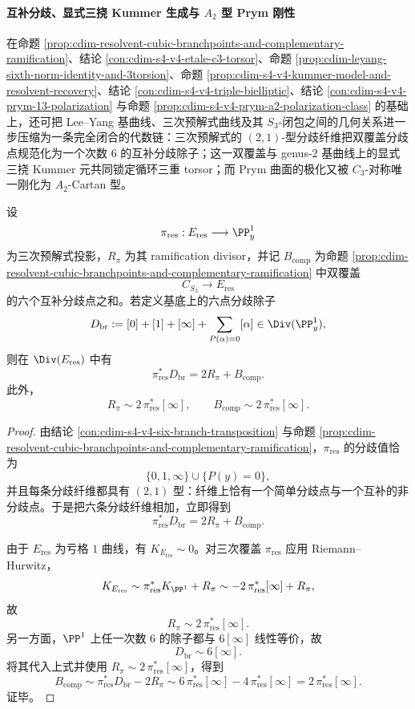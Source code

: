 \paragraph{互补分歧、显式三挠 Kummer 生成与 \texorpdfstring{$A_2$}{A2} 型 Prym 刚性}
在命题 \ref{prop:cdim-resolvent-cubic-branchpoints-and-complementary-ramification}、结论 \ref{con:cdim-s4-v4-etale-c3-torsor}、命题 \ref{prop:cdim-leyang-sixth-norm-identity-and-3torsion}、命题 \ref{prop:cdim-s4-v4-kummer-model-and-resolvent-recovery}、结论 \ref{con:cdim-s4-v4-triple-bielliptic}、结论 \ref{con:cdim-s4-v4-prym-13-polarization} 与命题 \ref{prop:cdim-s4-v4-prym-a2-polarization-class} 的基础上，还可把 Lee--Yang 基曲线、三次预解式曲线及其 \(S_3\)-闭包之间的几何关系进一步压缩为一条完全闭合的代数链：三次预解式的 \((2,1)\)-型分歧纤维把双覆盖分歧点规范化为一个次数 \(6\) 的互补分歧除子；这一双覆盖与 genus-\(2\) 基曲线上的显式三挠 Kummer 元共同锁定循环三重 torsor；而 Prym 曲面的极化又被 \(C_3\)-对称唯一刚化为 \(A_2\)-Cartan 型。

\begin{theorem}\label{thm:cdim-s4-v4-complementary-ramification-linear-equivalence}
设
\[
\pi_{\mathrm{res}}:E_{\mathrm{res}}\longrightarrow \PP^1_y
\]
为三次预解式投影，\(R_{\pi}\) 为其 ramification divisor，并记 \(B_{\mathrm{comp}}\) 为命题 \ref{prop:cdim-resolvent-cubic-branchpoints-and-complementary-ramification} 中双覆盖
\[
C_{S_3}\longrightarrow E_{\mathrm{res}}
\]
的六个互补分歧点之和。若定义基底上的六点分歧除子
\[
D_{\mathrm{br}}
:=
[0]+[1]+[\infty]+\sum_{P(\alpha)=0}[\alpha]\in \Div(\PP^1_y),
\]
则在 \(\Div(E_{\mathrm{res}})\) 中有
\[
\pi_{\mathrm{res}}^*D_{\mathrm{br}}=2R_{\pi}+B_{\mathrm{comp}}.
\]
此外，
\[
R_{\pi}\sim 2\,\pi_{\mathrm{res}}^*[\infty],
\qquad
B_{\mathrm{comp}}\sim 2\,\pi_{\mathrm{res}}^*[\infty].
\]
\end{theorem}
\begin{proof}
由结论 \ref{con:cdim-s4-v4-six-branch-transposition} 与命题 \ref{prop:cdim-resolvent-cubic-branchpoints-and-complementary-ramification}，\(\pi_{\mathrm{res}}\) 的分歧值恰为
\[
\{0,1,\infty\}\cup\{P(y)=0\},
\]
并且每条分歧纤维都具有 \((2,1)\) 型：纤维上恰有一个简单分歧点与一个互补的非分歧点。于是把六条分歧纤维相加，立即得到
\[
\pi_{\mathrm{res}}^*D_{\mathrm{br}}=2R_{\pi}+B_{\mathrm{comp}}.
\]

由于 \(E_{\mathrm{res}}\) 为亏格 \(1\) 曲线，有 \(K_{E_{\mathrm{res}}}\sim 0\)。对三次覆盖 \(\pi_{\mathrm{res}}\) 应用 Riemann--Hurwitz，
\[
K_{E_{\mathrm{res}}}\sim \pi_{\mathrm{res}}^*K_{\PP^1}+R_{\pi}
\sim -2\,\pi_{\mathrm{res}}^*[\infty]+R_{\pi},
\]
故
\[
R_{\pi}\sim 2\,\pi_{\mathrm{res}}^*[\infty].
\]
另一方面，\(\PP^1\) 上任一次数 \(6\) 的除子都与 \(6[\infty]\) 线性等价，故
\[
D_{\mathrm{br}}\sim 6[\infty].
\]
将其代入上式并使用 \(R_{\pi}\sim 2\,\pi_{\mathrm{res}}^*[\infty]\)，得到
\[
B_{\mathrm{comp}}
\sim
\pi_{\mathrm{res}}^*D_{\mathrm{br}}-2R_{\pi}
\sim
6\,\pi_{\mathrm{res}}^*[\infty]-4\,\pi_{\mathrm{res}}^*[\infty]
=
2\,\pi_{\mathrm{res}}^*[\infty].
\]
证毕。
\end{proof}

